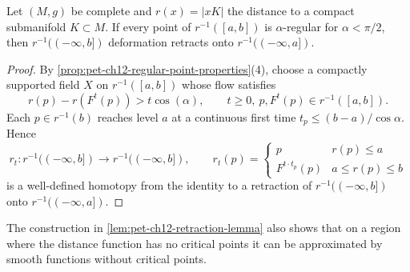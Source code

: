 \begin{lemma}
  \label{lem:pet-ch12-retraction-lemma}

  Let $(M,g)$ be complete and $r(x)=|xK|$ the distance to a compact submanifold
  $K\subset M$. If every point of $r^{-1}([a,b])$ is $\alpha$-regular for
  $\alpha<\pi/2$, then $r^{-1}((-\infty,b])$ deformation retracts onto
  $r^{-1}((-\infty,a])$.
\end{lemma}
\begin{proof}
  \sketch
  By \cref{prop:pet-ch12-regular-point-properties}(4), choose a compactly
  supported field $X$ on $r^{-1}([a,b])$ whose flow satisfies
  \[
    r(p)-r(F^t(p))>t\cos(\alpha),\qquad t\ge0,\ p,F^t(p)\in r^{-1}([a,b]).
  \]
  Each $p\in r^{-1}(b)$ reaches level $a$ at a continuous first time
  $t_p\le(b-a)/\cos\alpha$. Hence
  \[
    r_t:r^{-1}((-\infty,b])\to r^{-1}((-\infty,b]),\qquad
    r_t(p)=\begin{cases}p & r(p)\le a\\ F^{t\cdot t_p}(p) & a\le r(p)\le b\end{cases}
  \]
  is a well-defined homotopy from the identity to a retraction of
  $r^{-1}((-\infty,b])$ onto $r^{-1}((-\infty,a])$.
\end{proof}

\begin{remark}
  \label{rem:pet-ch12-retraction-remark}

  The construction in \cref{lem:pet-ch12-retraction-lemma} also shows that on a
  region where the
  distance function has no critical points it can be approximated by smooth
  functions without critical points.
\end{remark}

